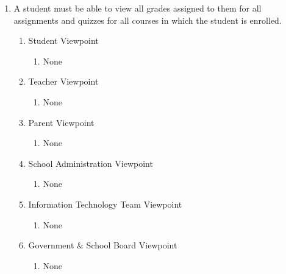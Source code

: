 \documentclass[]{article}
\begin{document}
\begin{enumerate}[{BE}1.]
	\item A student must be able to view all grades assigned to them for all 
assignments and quizzes for all courses in which the student is enrolled.
	\begin{enumerate}[{VP2}.1]
		\item Student Viewpoint
			\begin{enumerate}
				\item None
			\end{enumerate}
		\item Teacher Viewpoint
			\begin{enumerate}
				\item None
			\end{enumerate}
		\item Parent Viewpoint
			\begin{enumerate}
				\item None
			\end{enumerate}
		\item School Administration Viewpoint
			\begin{enumerate}
				\item None
			\end{enumerate}
		\item Information Technology Team Viewpoint
			\begin{enumerate}
				\item None
			\end{enumerate}
		\item Government \& School Board Viewpoint
			\begin{enumerate}
				\item None
			\end{enumerate}
	\end{enumerate}


\end{enumerate}
\end{document}
